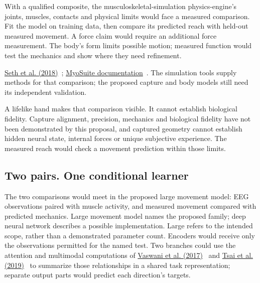 With a qualified composite, the musculoskeletal-simulation physics-engine's
joints, muscles, contacts and physical limits would face a measured comparison.
Fit the model on training data, then compare its predicted reach with
held-out measured movement. A force claim would require an additional force
measurement. The body's form limits possible motion; measured function would
test the mechanics and show where they need refinement.
\par\noindent \href{https://journals.plos.org/ploscompbiol/article?id=10.1371/journal.pcbi.1006223}{Seth et al. (2018)}~\cite{opensim2018}; \href{https://myosuite.readthedocs.io/en/latest/}{MyoSuite documentation}~\cite{myosuiteDocsUndated}. The simulation tools supply methods for that comparison; the proposed capture and body models still need its independent validation.

A lifelike hand makes that comparison visible. It cannot establish biological
fidelity. Capture alignment, precision, mechanics and biological fidelity have
not been demonstrated by this proposal, and captured geometry cannot establish
hidden neural state, internal forces or unique subjective experience. The
measured reach would check a movement prediction within those limits.

\subsection{Two pairs. One conditional learner}
The two comparisons would meet in the proposed large movement model: EEG
observations paired with muscle activity, and measured movement compared
with predicted mechanics. Large movement model names the proposed family;
deep neural network describes a possible implementation. Large refers to
the intended scope, rather than a demonstrated parameter count. Encoders
would receive only the observations permitted for the named test. Two
branches could use the attention and multimodal computations of
\href{https://arxiv.org/html/1706.03762v7}{Vaswani et al. (2017)}~\cite{vaswani2017} and \href{https://aclanthology.org/P19-1656/}{Tsai et al. (2019)}~\cite{tsai2019} to summarize those relationships
in a shared task representation; separate output parts would predict each
direction's targets.


